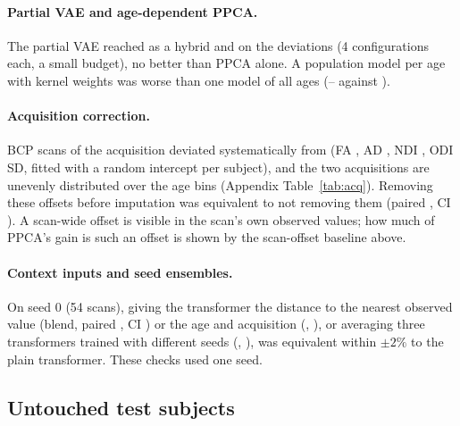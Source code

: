 \documentclass[11pt]{article}
\begin{document}
\paragraph{Partial VAE and age-dependent PPCA.} The partial VAE reached \sVaeHyb{} as a hybrid and \sVaeDev{} on the
deviations (4 configurations each, a small budget), no better than PPCA alone. A population model per age with kernel
weights was worse than one model of all ages (\sAgePpca--\sAgePpcaMax{} against \sPpca{}).

\paragraph{Acquisition correction.} BCP scans of the \texttt{\bcpAcqBName} acquisition deviated systematically from
\texttt{\bcpAcqAName} (FA \acqOffFA, AD \acqOffAD, NDI \acqOffNDI, ODI \acqOffODI{} SD, fitted with a random intercept per
subject), and the two acquisitions are unevenly distributed over the age bins (Appendix Table~\ref{tab:acq}). Removing
these offsets before imputation was equivalent to not removing them (paired \cPRatio, CI \cPBci). A scan-wide offset is
visible in the scan's own observed values; how much of PPCA's gain is such an offset is shown by the scan-offset baseline
above.

\paragraph{Context inputs and seed ensembles.} On seed 0 (54 scans), giving the transformer the distance to the
nearest observed value (blend, paired \xDistRatioBlend, CI \xDistCiBlend) or the age and acquisition
(\xCtxRatioBlend, \xCtxCiBlend), or averaging three transformers trained with different seeds (\xMembersRatioBlend,
\xMembersCiBlend), was equivalent within $\pm2\%$ to the plain transformer. These checks used one seed.

\subsection{Untouched test subjects}\label{sec:e1}

\begin{table}[t]
\centering\footnotesize
\caption{E1: untouched subjects (seeds 3--5; subjects of seeds 0--2 excluded; \eOneScansBinA, \eOneScansBinB{} and
\eOneScansBinC{} scans per draw in the three bins), the shipped weight table scored as released. ``Real mask'': the
fourth pass.}\label{tab:e1}
\resizebox{\textwidth}{!}{}
\end{table}
\end{document}
